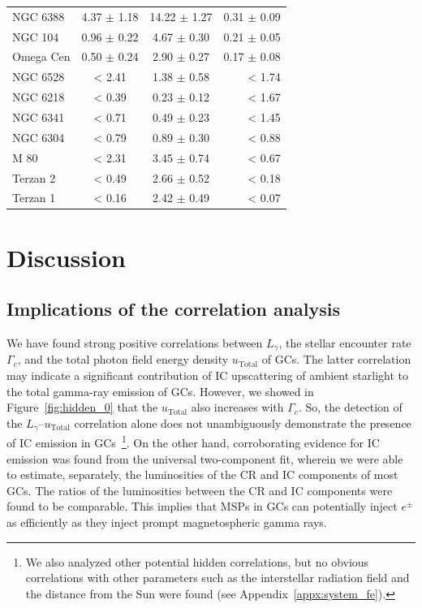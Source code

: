 \documentclass[doublespace,nopageskip]{VTthesis} %
\begin{document}
\begin{table}
\begin{tabular}{lccr}
NGC 6388 & 4.37 $\pm$ 1.18 & 14.22 $\pm$ 1.27 & 0.31 $\pm$ 0.09 \\
NGC 104 & 0.96 $\pm$ 0.22 & 4.67 $\pm$ 0.30 & 0.21 $\pm$ 0.05 \\
Omega Cen & 0.50 $\pm$ 0.24 & 2.90 $\pm$ 0.27 & 0.17 $\pm$ 0.08 \\
NGC 6528 & < 2.41 & 1.38 $\pm$ 0.58 & < 1.74 \\
NGC 6218 & < 0.39  &  0.23 $\pm$ 0.12 & < 1.67 \\
NGC 6341 & < 0.71  &  0.49 $\pm$ 0.23 & < 1.45 \\
NGC 6304 & < 0.79  &  0.89 $\pm$ 0.30 & < 0.88 \\
M 80 & < 2.31  &  3.45 $\pm$ 0.74 & < 0.67 \\
Terzan 2 & < 0.49  &  2.66 $\pm$ 0.52 & < 0.18 \\
Terzan 1 & < 0.16  &  2.42 $\pm$ 0.49 & < 0.07 \\
\bottomrule
    \end{tabular}
    \label{tab:ratio}
\end{table}

\section{Discussion}\label{sec:discussion}

\subsection{Implications of the correlation analysis}

We have found strong positive correlations between $L_\gamma$, the stellar encounter rate $\Gamma_c$, and the total photon field energy density $u_\mathrm{Total}$ of GCs. The latter correlation may indicate a significant contribution of IC upscattering of ambient starlight to the total gamma-ray emission of GCs. However, we showed in Figure~\ref{fig:hidden_0} that the $u_\mathrm{Total}$ also increases with $\Gamma_c$. So, the detection of the $L_\gamma$--$u_\mathrm{Total}$ correlation alone does not unambiguously demonstrate the presence of IC emission in GCs~\footnote{We also analyzed other potential hidden correlations, but no obvious correlations with other parameters such as the interstellar radiation field and the distance from the Sun were found (see Appendix~\ref{appx:system_fe}).}. On the other hand, corroborating evidence for IC emission was found from the universal two-component fit, wherein we were able to estimate, separately, the luminosities of the CR and IC components of most GCs. The ratios of the luminosities between the CR and IC components were found to be comparable. This implies that MSPs in GCs can potentially inject $e^{\pm}$ as efficiently as they inject prompt magnetospheric gamma rays.
\end{document}

